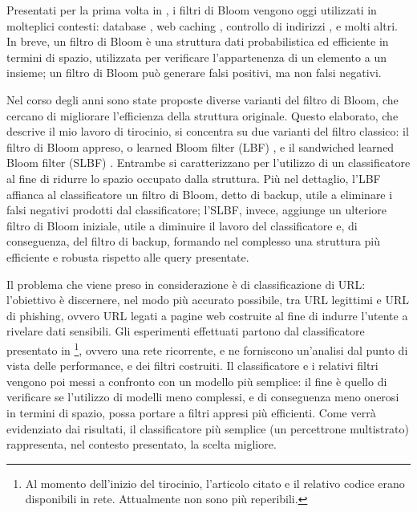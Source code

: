 \documentclass[../../main.tex]{subfiles}
\begin{document}
    
    Presentati per la prima volta in \cite{Bloom1970SpacetimeTI}, i filtri di Bloom vengono oggi utilizzati in molteplici contesti: database \cite{kraska2018case}, web caching \cite{Maggs15algorithmicnuggets}, controllo di indirizzi \cite{Dharmapurikar2006LongestPM}, e molti altri. In breve, un filtro di Bloom è una struttura dati probabilistica ed efficiente in termini di spazio, utilizzata per verificare l'appartenenza di un elemento a un insieme; un filtro di Bloom può generare falsi positivi, ma non falsi negativi.

    Nel corso degli anni sono state proposte diverse varianti del filtro di Bloom, che cercano di migliorare l'efficienza della struttura originale. Questo elaborato, che descrive il mio lavoro di tirocinio, si concentra su due varianti del filtro classico: il filtro di Bloom appreso, o learned Bloom filter (LBF) \cite{kraska2018case}, e il sandwiched learned Bloom filter (SLBF) \cite{10.5555/3326943.3326986}. Entrambe si caratterizzano per l'utilizzo di un classificatore al fine di ridurre lo spazio occupato dalla struttura. Più nel dettaglio, l'LBF affianca al classificatore un filtro di Bloom, detto di backup, utile a eliminare i falsi negativi prodotti dal classificatore; l'SLBF, invece, aggiunge un ulteriore filtro di Bloom iniziale, utile a diminuire il lavoro del classificatore e, di conseguenza, del filtro di backup, formando nel complesso una struttura più efficiente e robusta rispetto alle query presentate.

    Il problema che viene preso in considerazione è di classificazione di URL: l'obiettivo è discernere, nel modo più accurato possibile, tra URL legittimi e URL di phishing, ovvero URL legati a pagine web costruite al fine di indurre l'utente a rivelare dati sensibili. Gli esperimenti effettuati partono dal classificatore presentato in \cite{ma2020}\footnote{Al momento dell'inizio del tirocinio, l'articolo citato e il relativo codice erano disponibili in rete. Attualmente non sono più reperibili.}, ovvero una rete ricorrente, e ne forniscono un'analisi dal punto di vista delle performance, e dei filtri costruiti. Il classificatore e i relativi filtri vengono poi messi a confronto con un modello più semplice: il fine è quello di verificare se l'utilizzo di modelli meno complessi, e di conseguenza meno onerosi in termini di spazio, possa portare a filtri appresi più efficienti. Come verrà evidenziato dai risultati, il classificatore più semplice (un percettrone multistrato) rappresenta, nel contesto presentato, la scelta migliore.
\end{document}
